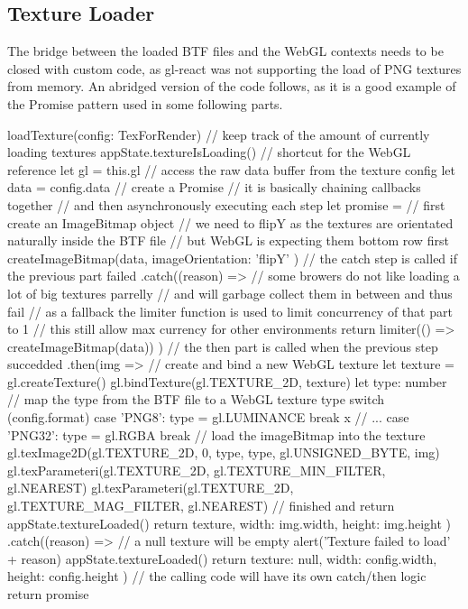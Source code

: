 \subsection{Texture Loader}\label{sec_textureloader}
The bridge between the loaded BTF files and the WebGL contexts needs to be
closed with custom code, as gl-react was not supporting the load of PNG textures
from memory. An abridged version of the code follows, as it is a good example of
the Promise pattern used in some following parts.
\begin{typescript}
loadTexture(config: TexForRender) {
    // keep track of the amount of currently loading textures
    appState.textureIsLoading()
    // shortcut for the WebGL reference
    let gl = this.gl
    // access the raw data buffer from the texture config
    let data = config.data
    // create a Promise
    // it is basically chaining callbacks together
    // and then asynchronously executing each step
    let promise =
        // first create an ImageBitmap object
        // we need to flipY as the textures are orientated naturally inside the BTF file
        // but WebGL is expecting them bottom row first
        createImageBitmap(data, { imageOrientation: 'flipY' })
        // the catch step is called if the previous part failed
        .catch((reason) => {
            // some browers do not like loading a lot of big textures parrelly
            // and will garbage collect them in between and thus fail
            // as a fallback the limiter function is used to limit concurrency of that part to 1
            // this still allow max currency for other environments
            return limiter(() => createImageBitmap(data))
        })
        // the then part is called when the previous step succedded
        .then(img => {
            // create and bind a new WebGL texture
            let texture = gl.createTexture()
            gl.bindTexture(gl.TEXTURE_2D, texture)
            let type: number
            // map the type from the BTF file to a WebGL texture type
            switch (config.format) {
                case 'PNG8':
                    type = gl.LUMINANCE
                    break
x                // ...
                case 'PNG32':
                    type = gl.RGBA
                    break
            }
            // load the imageBitmap into the texture
            gl.texImage2D(gl.TEXTURE_2D, 0, type, type, gl.UNSIGNED_BYTE, img)
            gl.texParameteri(gl.TEXTURE_2D, gl.TEXTURE_MIN_FILTER, gl.NEAREST)
            gl.texParameteri(gl.TEXTURE_2D, gl.TEXTURE_MAG_FILTER, gl.NEAREST)
            // finished and return
            appState.textureLoaded()
            return { texture, width: img.width, height: img.height }
        })
        .catch((reason) => {
            // a null texture will be empty
            alert('Texture failed to load' + reason)
            appState.textureLoaded()
            return { texture: null, width: config.width, height: config.height }
        })
   // the calling code will have its own catch/then logic
   return promise
}
\end{typescript}


